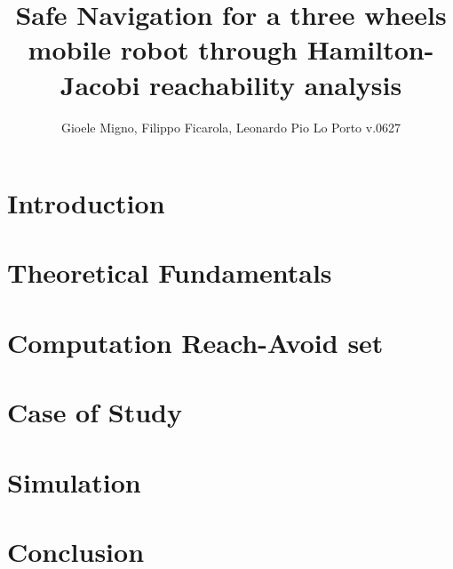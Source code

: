 \documentclass[conference]{IEEEtran}
\begin{document}
    
    \title{Safe Navigation for a three wheels mobile robot through Hamilton-Jacobi reachability analysis}
    \author{Gioele Migno, Filippo Ficarola, Leonardo Pio Lo Porto \LARGE v.0627 }
    \maketitle
    
    
    
    \section{Introduction}
        \label{introduction}
        
    
    \section{Theoretical Fundamentals}
        \label{theoretical_fundamentals}
        
    
    \section{Computation Reach-Avoid set}
        \label{comp_ras}
        

    \section{Case of Study}
        \label{case_of_study}
        

    \section{Simulation}
        \label{simulation}
        
        
    \section{Conclusion}
        

    \clearpage
    \appendix
        

    \newpage
    
\end{document}
